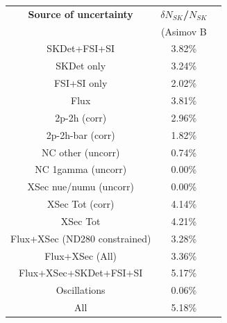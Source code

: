 \begin{table}[htb]
\centering
\begin{tabular}{| c | c | c |}
\hline
  {\bf Source of uncertainty}    & \multicolumn{1}{c|}{{\bf ${\delta}N_{SK}$/$N_{SK}$}}\\
                                 & \multicolumn{1}{c|}{(Asimov B}\\

\hline
\hline  
SKDet+FSI+SI                   & 3.82\%                        \\
SKDet only                   & 3.24\%                        \\
FSI+SI only                   & 2.02\%                        \\
\hline
  Flux                           & 3.81\%                        \\
\hline
\hline
  2p-2h (corr)                     & 2.96\%                        \\
  2p-2h-bar (corr)                  & 1.82\%                        \\
  NC other (uncorr)              & 0.74\%                        \\
  NC 1gamma (uncorr)             & 0.00\%                        \\
  XSec nue/numu (uncorr)                  & 0.00\%                        \\
\hline
  XSec Tot (corr)                  & 4.14\%                        \\
  XSec Tot                       & 4.21\%                        \\
\hline
\hline
  Flux+XSec (ND280 constrained)                      & 3.28\%                        \\
  Flux+XSec (All)	                    & 3.36\%                        \\
\hline
\hline
  Flux+XSec+SKDet+FSI+SI         & 5.17\%     \\
\hline
\hline
  Oscillations                   & 0.06\%                        \\
\hline
\hline
  All                            & 5.18\%                        \\
\hline
\hline


\end{tabular}
\end{table}
